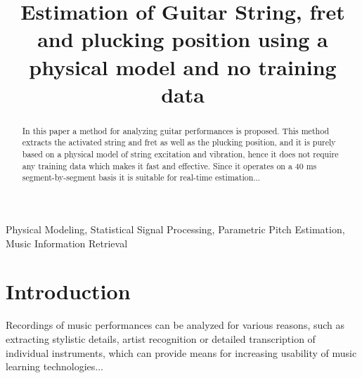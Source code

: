 \documentclass{article}
\title{Estimation of Guitar String, fret and plucking position using a physical model and no training data}
\begin{document}
\ninept
\maketitle

\begin{sloppy}

\begin{abstract}
  In this paper a method for analyzing guitar performances is proposed. This method extracts the activated string and fret as well as the plucking position, and it is purely based on a physical model of string excitation and vibration, hence it does not require any training data which makes it fast and effective. Since it operates on a 40 ms segment-by-segment basis it is suitable for real-time estimation...
\end{abstract}
%
\begin{keywords}
 Physical Modeling, Statistical Signal Processing, Parametric Pitch Estimation, Music Information Retrieval\vspace{-.8mm}
 \end{keywords}
%
\section{Introduction}
\label{sec:intro}
%
Recordings of music performances can be analyzed for various reasons, such as extracting stylistic details, artist recognition or detailed transcription of individual instruments, which can provide means for increasing usability of music learning technologies... 

\end{sloppy}
\end{document}

